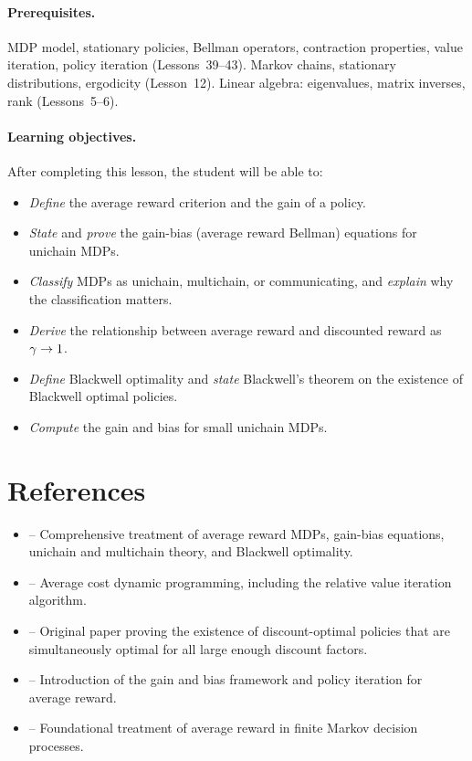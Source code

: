 \documentclass[11pt,a4paper]{article}
\begin{document}
\paragraph{Prerequisites.}
MDP model, stationary policies, Bellman operators, contraction
properties, value iteration, policy iteration (Lessons~39--43).
Markov chains, stationary distributions, ergodicity (Lesson~12).
Linear algebra: eigenvalues, matrix inverses, rank (Lessons~5--6).

\paragraph{Learning objectives.}
After completing this lesson, the student will be able to:
\begin{itemize}
    \item \emph{Define} the average reward criterion and the gain of
    a policy.
    \item \emph{State} and \emph{prove} the gain-bias (average
    reward Bellman) equations for unichain MDPs.
    \item \emph{Classify} MDPs as unichain, multichain, or
    communicating, and \emph{explain} why the classification matters.
    \item \emph{Derive} the relationship between average reward and
    discounted reward as $\gamma \to 1$.
    \item \emph{Define} Blackwell optimality and \emph{state}
    Blackwell's theorem on the existence of Blackwell optimal
    policies.
    \item \emph{Compute} the gain and bias for small unichain MDPs.
\end{itemize}


\section{References}
\label{sec:references}

\begin{itemize}
    \item \citet[Chapters 8--9]{puterman2014} -- Comprehensive
    treatment of average reward MDPs, gain-bias equations, unichain
    and multichain theory, and Blackwell optimality.
    \item \citet[Chapter 7]{bertsekas2012} -- Average cost dynamic
    programming, including the relative value iteration algorithm.
    \item \citet{blackwell1962} -- Original paper proving the
    existence of discount-optimal policies that are simultaneously
    optimal for all large enough discount factors.
    \item \citet{howard1960} -- Introduction of the gain and bias
    framework and policy iteration for average reward.
    \item \citet{derman1970} -- Foundational treatment of average
    reward in finite Markov decision processes.
\end{itemize}
\end{document}
